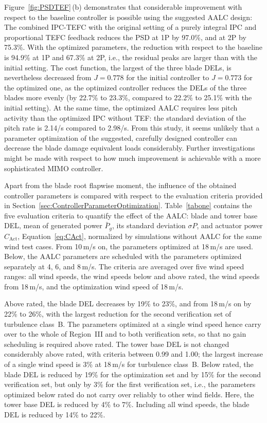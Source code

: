 Figure~\ref{fig:PSDTEF}\,(b) demonstrates that considerable improvement with respect to the baseline controller is possible using the suggested AALC design: The combined IPC-TEFC with the original setting of a purely integral IPC and proportional TEFC feedback reduces the PSD at 1P by 97.0\%, and at 2P by 75.3\%. With the optimized parameters, the reduction with respect to the baseline is 94.9\% at 1P and 67.3\% at 2P, i.e., the residual peaks are larger than with the initial setting. The cost function, the largest of the three blade DELs, is nevertheless decreased from $J = 0.778$ for the initial controller to $J = 0.773$ for the optimized one, as the optimized controller reduces the DELs of the three blades more evenly (by 22.7\% to 23.3\%, compared to 22.2\% to 25.1\% with the initial setting). At the same time, the optimized AALC requires less pitch activity than the optimized IPC without TEF: the standard deviation of the pitch rate is 2.14\textdegree/s compared to 2.98\textdegree/s.
From this study, it seems unlikely that a parameter optimization of the suggested, carefully designed controller can decrease the blade damage equivalent loads considerably. Further investigations might be made with respect to how much improvement is achievable with a more sophisticated MIMO controller.

Apart from the blade root flapwise moment, the influence of the obtained controller parameters is compared with respect to the evaluation criteria provided in Section~\ref{sec:ControllerParameterOptimization}.
Table~\ref{tabone} contains the five evaluation criteria to quantify the effect of the AALC: blade and tower base DEL, mean of generated power $\bar{P}_{g}$, its standard deviation $\sigma P$, and actuator power $C_{\text{Act}}$, Equation~\eqref{eq:CAct}, normalized by simulations without AALC for the same wind test cases. From 10\,m/s on, the parameters optimized at 18\,m/s are used. Below, the AALC parameters are scheduled with the parameters optimized separately at 4, 6, and 8\,m/s. The criteria are averaged over five wind speed ranges: all wind speeds, the wind speeds below and above rated, the wind speeds from 18\,m/s, and the optimization wind speed of 18\,m/s.


Above rated, the blade DEL decreases by 19\% to 23\%, and from 18\,m/s on by 22\% to 26\%, with the largest reduction for the second verification set of turbulence class~B. The parameters optimized at a single wind speed hence carry over to the whole of Region~III and to both verification sets, so that no gain scheduling is required above rated. The tower base DEL is not changed considerably above rated, with criteria between 0.99 and 1.00; the largest increase of a single wind speed is 3\% at 18\,m/s for turbulence class~B. Below rated, the blade DEL is reduced by 19\% for the optimization set and by 15\% for the second verification set, but only by 3\% for the first verification set, i.e., the parameters optimized below rated do not carry over reliably to other wind fields. Here, the tower base DEL is reduced by 4\% to 7\%. Including all wind speeds, the blade DEL is reduced by 14\% to 22\%.

